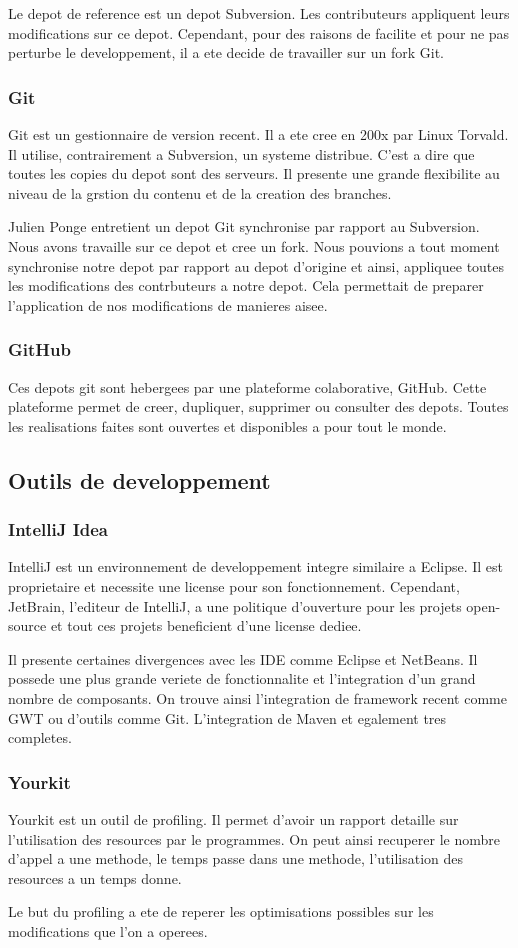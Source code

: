 Le depot de reference est un depot Subversion. Les contributeurs appliquent leurs modifications sur ce depot. Cependant, pour des raisons de facilite et pour ne pas perturbe le developpement, il a ete decide de travailler sur un fork Git.
\subsubsection{Git}
Git est un gestionnaire de version recent. Il a ete cree en 200x par Linux Torvald. Il utilise, contrairement a Subversion, un systeme distribue. C'est a dire que toutes les copies du depot sont des serveurs. Il presente une grande flexibilite au niveau de la grstion du contenu et de la creation des branches.

Julien Ponge entretient un depot Git synchronise par rapport au Subversion. Nous avons travaille sur ce depot et cree un fork. Nous pouvions a tout moment synchronise notre depot par rapport au depot d'origine et ainsi, appliquee toutes les modifications des contrbuteurs a notre depot. Cela permettait de preparer l'application de nos modifications de manieres aisee.
\subsubsection{GitHub}
Ces depots git sont hebergees par une plateforme colaborative, GitHub. Cette plateforme permet de creer, dupliquer, supprimer ou consulter des depots. Toutes les realisations faites sont ouvertes et disponibles a pour tout le monde.
\subsection{Outils de developpement}
\subsubsection{IntelliJ Idea}
IntelliJ est un environnement de developpement integre similaire a Eclipse. Il est proprietaire et necessite une license pour son fonctionnement. Cependant, JetBrain, l'editeur de IntelliJ, a une politique d'ouverture pour les projets open-source et tout ces projets beneficient d'une license dediee. 

Il presente certaines divergences avec les IDE comme Eclipse et NetBeans. Il possede une plus grande veriete de fonctionnalite et l'integration d'un grand nombre de composants. On trouve ainsi l'integration de framework recent comme GWT ou d'outils comme Git. L'integration de Maven et egalement tres completes. 
\subsubsection{Yourkit}
Yourkit est un outil de profiling. Il permet d'avoir un rapport detaille sur l'utilisation des resources par le programmes. On peut ainsi recuperer le nombre d'appel a une methode, le temps passe dans une methode, l'utilisation des resources a un temps donne.

Le but du profiling a ete de reperer les optimisations possibles sur les modifications que l'on a operees.